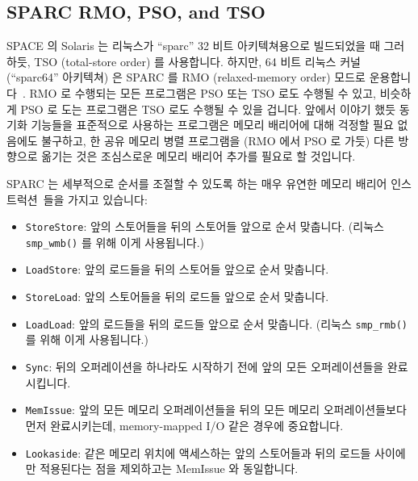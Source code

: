 \subsection{SPARC RMO, PSO, and TSO}

SPACE 의 Solaris 는 리눅스가 ``sparc'' 32 비트 아키텍쳐용으로 빌드되었을 때
그러하듯, TSO (total-store order) 를 사용합니다.
하지만, 64 비트 리눅스 커널 (``sparc64'' 아키텍쳐) 은 SPARC 를 RMO
(relaxed-memory order) 모드로 운용합니다~\cite{SPARC94}.
RMO 로 수행되는 모든 프로그램은 PSO 또는 TSO 로도 수행될 수 있고, 비슷하게 PSO
로 도는 프로그램은 TSO 로도 수행될 수 있을 겁니다.
앞에서 이야기 했듯 동기화 기능들을 표준적으로 사용하는 프로그램은 메모리
배리어에 대해 걱정할 필요 없음에도 불구하고, 한 공유 메모리 병렬 프로그램을
(RMO 에서 PSO 로 가듯) 다른 방향으로 옮기는 것은 조심스로운 메모리 배리어
추가를 필요로 할 것입니다.

SPARC 는 세부적으로 순서를 조절할 수 있도록 하는 매우 유연한 메모리 배리어
인스트럭션~\cite{SPARC94}들을 가지고 있습니다:
\begin{itemize}
\item	{\tt StoreStore}: 앞의 스토어들을 뒤의 스토어들 앞으로 순서 맞춥니다.
	(리눅스 {\tt smp\_wmb()} 를 위해 이게 사용됩니다.)
\item	{\tt LoadStore}: 앞의 로드들을 뒤의 스토어들 앞으로 순서 맞춥니다.
\item	{\tt StoreLoad}: 앞의 스토어들을 뒤의 로드들 앞으로 순서 맞춥니다.
\item	{\tt LoadLoad}: 앞의 로드들을 뒤의 로드들 앞으로 순서 맞춥니다.
	(리눅스 {\tt smp\_rmb()} 를 위해 이게 사용됩니다.)
\item	{\tt Sync}: 뒤의 오퍼레이션을 하나라도 시작하기 전에 앞의 모든
	오퍼레이션들을 완료시킵니다.
\item	{\tt MemIssue}: 앞의 모든 메모리 오퍼레이션들을 뒤의 모든 메모리
	오퍼레이션들보다 먼저 완료시키는데, memory-mapped I/O 같은 경우에
	중요합니다.
\item	{\tt Lookaside}: 같은 메모리 위치에 액세스하는 앞의 스토어들과 뒤의
	로드들 사이에만 적용된다는 점을 제외하고는 MemIssue 와 동일합니다.
\end{itemize}
\iffalse

